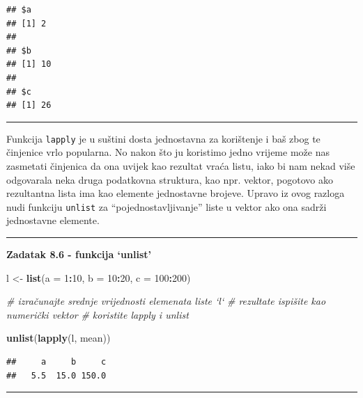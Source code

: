 \documentclass[]{book}
\newenvironment{Shaded}{\begin{snugshade}}{\end{snugshade}}
\newcommand{\KeywordTok}[1]{\textcolor[rgb]{0.13,0.29,0.53}{\textbf{#1}}}
\newcommand{\DataTypeTok}[1]{\textcolor[rgb]{0.13,0.29,0.53}{#1}}
\newcommand{\DecValTok}[1]{\textcolor[rgb]{0.00,0.00,0.81}{#1}}
\newcommand{\StringTok}[1]{\textcolor[rgb]{0.31,0.60,0.02}{#1}}
\newcommand{\CommentTok}[1]{\textcolor[rgb]{0.56,0.35,0.01}{\textit{#1}}}
\newcommand{\OperatorTok}[1]{\textcolor[rgb]{0.81,0.36,0.00}{\textbf{#1}}}
\newcommand{\NormalTok}[1]{#1}
\theoremstyle{definition}
\theoremstyle{definition}
\theoremstyle{definition}
\theoremstyle{remark}
\begin{document}
\begin{verbatim}
## $a
## [1] 2
## 
## $b
## [1] 10
## 
## $c
## [1] 26
\end{verbatim}

\begin{center}\rule{0.5\linewidth}{\linethickness}\end{center}

Funkcija \texttt{lapply} je u suštini dosta jednostavna za korištenje i
baš zbog te činjenice vrlo popularna. No nakon što ju koristimo jedno
vrijeme može nas zasmetati činjenica da ona uvijek kao rezultat vraća
listu, iako bi nam nekad više odgovarala neka druga podatkovna
struktura, kao npr. vektor, pogotovo ako rezultantna lista ima kao
elemente jednostavne brojeve. Upravo iz ovog razloga nudi funkciju
\texttt{unlist} za ``pojednostavljivanje'' liste u vektor ako ona sadrži
jednostavne elemente.

\begin{center}\rule{0.5\linewidth}{\linethickness}\end{center}

\textbf{Zadatak 8.6 - funkcija `unlist'}

\begin{Shaded}
\begin{Highlighting}[]
\NormalTok{l <-}\StringTok{ }\KeywordTok{list}\NormalTok{(}\DataTypeTok{a =} \DecValTok{1}\OperatorTok{:}\DecValTok{10}\NormalTok{, }\DataTypeTok{b =} \DecValTok{10}\OperatorTok{:}\DecValTok{20}\NormalTok{, }\DataTypeTok{c =} \DecValTok{100}\OperatorTok{:}\DecValTok{200}\NormalTok{)}


\CommentTok{# izračunajte srednje vrijednosti elemenata liste `l`}
\CommentTok{# rezultate ispišite kao numerički vektor}
\CommentTok{# koristite lapply i unlist}
\end{Highlighting}
\end{Shaded}

\begin{Shaded}
\begin{Highlighting}[]
\KeywordTok{unlist}\NormalTok{(}\KeywordTok{lapply}\NormalTok{(l, mean))}
\end{Highlighting}
\end{Shaded}

\begin{verbatim}
##     a     b     c 
##   5.5  15.0 150.0
\end{verbatim}

\begin{center}\rule{0.5\linewidth}{\linethickness}\end{center}
\end{document}
